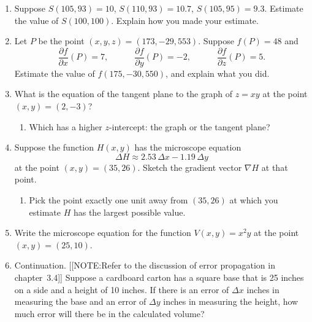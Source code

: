 \begin{enumerate}
  \begin{enumerate}
  \item Estimate the value of $Q(27, 31.9)$.


\end{enumerate}
\item Suppose $S(105, 93) = 10$, $S(110, 93) = 10.7$, $S(105, 95) =
9.3$.  Estimate the value of $S(100, 100)$.  Explain how you made your
estimate.



\item Let $P$ be the point $(x, y, z) =(173, -29, 553)$.  Suppose $f(P)
= 48$ and
	\[
\dfrac{\partial f}{\partial x}(P) = 7, \qquad \quad
		\dfrac{\partial f}{\partial y}(P) = -2, \qquad \quad
		\dfrac{\partial f}{\partial z}(P) = 5.
\]
Estimate the value of $f(175, -30, 550)$, and explain what you did.


\item What is the equation of the tangent plane to the graph of $z =
xy$ at the point $(x, y) = (2, -3)$?

  \begin{enumerate}
  \item Which has a higher $z$-intercept: the graph or the tangent plane?


\end{enumerate}
\item Suppose the function $H(x, y)$ has the microscope equation
	\[
\Delta H \approx 2.53 \, \Delta x - 1.19 \, \Delta y
\]
at the point $(x, y) = (35, 26)$.  Sketch the gradient vector $\nabla\!
H$ at that point.

  \begin{enumerate}
  \item Pick the point exactly one unit away from $(35, 26)$ at which you
estimate $H$ has the largest possible value.



\end{enumerate}
\item Write the microscope equation for the function $V(x, y) = x^2 y$
at the point $(x, y) = (25, 10)$.


\item Continuation.
[[NOTE:Refer to the discussion of error propagation in chapter~3.4]]
Suppose a cardboard carton has a square base that is 25 inches on a
side and a height of 10 inches.  If there is an error of $\Delta x$
inches in measuring the base and an error of $\Delta y$ inches in
measuring the height, how much error will there be in the calculated
volume?


\end{enumerate}
